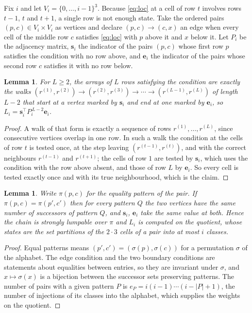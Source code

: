 \documentclass[11pt,a4paper]{article}
\theoremstyle{plain}
\newtheorem{lemma}[theorem]{Lemma}
\theoremstyle{definition}
\begin{document}
Fix $i$ and let $V_i=\{0,\dots,i-1\}^{3}$. Because \eqref{eq:loc} at a cell of row
$t$ involves rows $t-1$, $t$ and $t+1$, a single row is not enough state. Take the
ordered pairs $(p,c)\in V_i\times V_i$ as vertices and declare $(p,c)\to(c,x)$ an edge when
every cell of the middle row $c$ satisfies \eqref{eq:loc} with $p$ above it and $x$
below it. Let $P_i$ be the adjacency matrix, $\mathbf{s}_i$ the indicator of the pairs
$(p,c)$ whose first row $p$ satisfies the condition with no row above, and
$\mathbf{e}_i$ the indicator of the pairs whose second row $c$ satisfies it with no
row below.

\begin{lemma}\label{lem:walk}
For $L\ge2$, the arrays of $L$ rows satisfying the condition are exactly the walks
$(r^{(1)},r^{(2)})\to(r^{(2)},r^{(3)})\to\cdots\to(r^{(L-1)},r^{(L)})$ of length
$L-2$ that start at a vertex marked by $\mathbf{s}_i$ and end at one marked by
$\mathbf{e}_i$, so
$L_i=\mathbf{s}_i^{\!\top}P_i^{\,L-2}\mathbf{e}_i$.
\end{lemma}

\begin{proof}
A walk of that form is exactly a sequence of rows $r^{(1)},\dots,r^{(L)}$, since
consecutive vertices overlap in one row. In such a walk the condition at the cells of
row $t$ is tested once, at the step leaving $(r^{(t-1)},r^{(t)})$, and with the
correct neighbours $r^{(t-1)}$ and $r^{(t+1)}$; the cells of row $1$ are tested by
$\mathbf{s}_i$, which uses the condition with the row above absent, and those of row
$L$ by $\mathbf{e}_i$. So every cell is tested exactly once and with its true
neighbourhood, which is the claim.
\end{proof}

\begin{lemma}\label{lem:lump}
Write $\pi(p,c)$ for the equality pattern of the pair. If $\pi(p,c)=\pi(p',c')$ then for
every pattern $Q$ the two vertices have the same number of successors of pattern $Q$, and
$\mathbf{s}_i$, $\mathbf{e}_i$ take the same value at both. Hence the chain is strongly
lumpable over $\pi$ and $L_i$ is computed on the quotient, whose states are the set
partitions of the $2\cdot3$ cells of a pair into at most $i$ classes.
\end{lemma}

\begin{proof}
Equal patterns means $(p',c')=(\sigma(p),\sigma(c))$ for a permutation $\sigma$ of the
alphabet. The edge condition and the two boundary conditions are statements about equalities
between entries, so they are invariant under $\sigma$, and $x\mapsto\sigma(x)$ is a bijection
between the successor sets preserving patterns. The number of pairs with a given pattern $P$
is $e_P=i(i-1)\cdots(i-|P|+1)$, the number of injections of its classes into the alphabet,
which supplies the weights on the quotient.
\end{proof}
\end{document}

